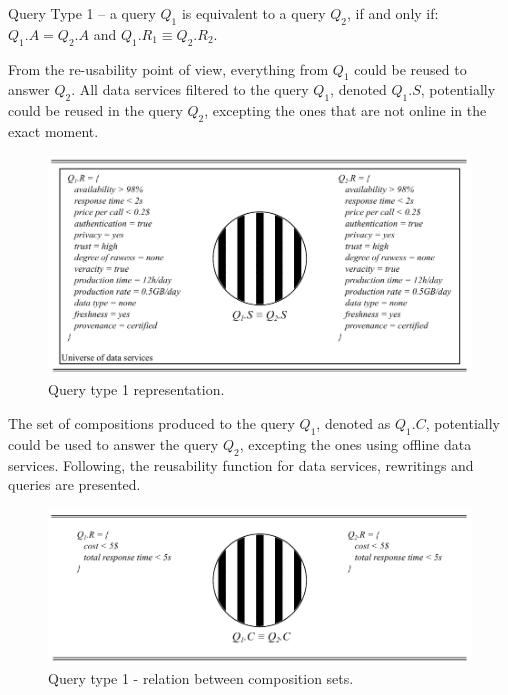 \begin{definition}\label{def:qt1}
Query Type 1 -- a query $Q_{1}$ is equivalent to a query $Q_{2}$, if and only if: $Q_{1}.A = Q_{2}.A$ and $Q_{1}.R_{1} \equiv Q_{2}.R_{2}$.
\end{definition}

From the re-usability point of view, everything from $Q_{1}$ could be reused to answer $Q_{2}$. All data services filtered to the query $Q_{1}$, denoted $Q_{1}.S$, potentially could be reused in the query $Q_{2}$, excepting the ones that are not online in the exact moment. 

\begin{figure}[!htbp]
\center
\includegraphics[scale=0.7]{images/QT1-DATA-SERVICES.pdf}
\caption{Query type 1 representation.}
\label{fig:qt1}
\end{figure}

The set of compositions produced to the query $Q_{1}$, denoted as $Q_{1}.C$, potentially could be used to answer the query $Q_{2}$, excepting the ones using offline data services. Following, the reusability function for data services, rewritings and queries are presented. 

\begin{figure}[!h]
\center
\includegraphics[scale=0.7]{images/QT1-COMPOSITIONS.pdf}
\caption{Query type 1 - relation between composition sets.}
\label{fig:qt1-c}
\end{figure}

